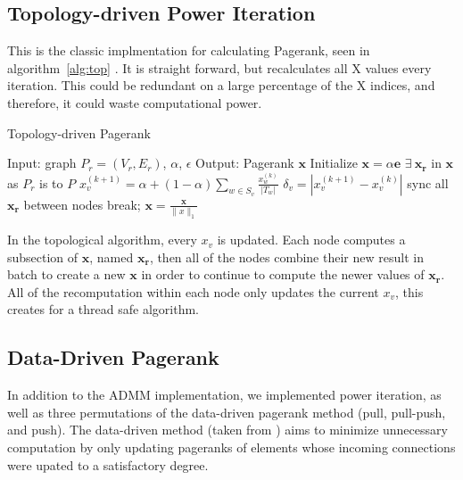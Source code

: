 \documentclass[letterpaper,12pt,onecolumn]{article}
\begin{document}
\subsection{Topology-driven Power Iteration}
This is the classic implmentation for calculating Pagerank, seen in algorithm~\ref{alg:top} . It is straight forward, but recalculates all X values every iteration. This could be redundant on a large percentage of the X indices, and therefore, it could waste computational power. 

\begin{algorithm}
\caption{Topology-driven Pagerank}
\label{alg:top}
\begin{algorithmic}[1]
  \STATE Input: graph $P_{r} = (V_r, E_r)$, $\alpha$, $\epsilon$
  \STATE Output: Pagerank $\mathbf{x}$
  \STATE Initialize $\mathbf{x} = \alpha \mathbf{e}$
  \STATE $\exists  \medspace \mathbf{x_r}$ in $\mathbf{x}$ as $P_r$ is to $P$
		\STATE $x_{v}^{(k+1)} = \alpha + (1 - \alpha) \sum_{w \in S_v} \frac{x_{w}^{(k)}}{|T_w|} $
		\STATE $\delta_{v} = | x_{v}^{(k+1)} - x_{v}^{(k)} | $
	\ENDFOR
	\STATE sync all $\mathbf{x_r}$ between nodes
	\IF{$\|\delta \|_{\infty} < \epsilon$}
		\STATE break;
	\ENDIF
  \ENDWHILE
  \STATE $\mathbf{x} = \frac{\mathbf{x} }{\|x\|_{1}}$
\end{algorithmic}
\end{algorithm}

In the topological algorithm, every $x_v$ is updated. Each node computes a subsection of $\mathbf{x}$, named $\mathbf{x_r}$, then all of the nodes combine their new result in batch to create a new $\mathbf{x}$ in order to continue to compute the newer values of $\mathbf{x_r}$. All of the recomputation within each node only updates the current $x_v$, this creates for a thread safe algorithm.

\subsection{Data-Driven Pagerank}
In addition to the ADMM implementation, we implemented power iteration, as well as three permutations of the data-driven pagerank method (pull, pull-push, and push). The data-driven method (taken from \cite{Joyce}) aims to minimize unnecessary computation by only updating pageranks of elements whose incoming connections were upated to a satisfactory degree. 
\end{document}
